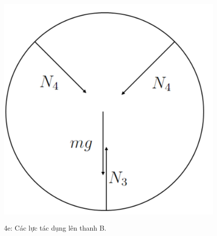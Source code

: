 \begin{figure}[h]
\begin{minipage}{5cm}
    \includegraphics[width=1.08\textwidth]{images/Hinh 4e.PNG}
    \begin{center}
      \figurename{ 4e: Các lực tác dụng lên thanh B.}
    \end{center}
  \end{minipage}
\end{figure}

